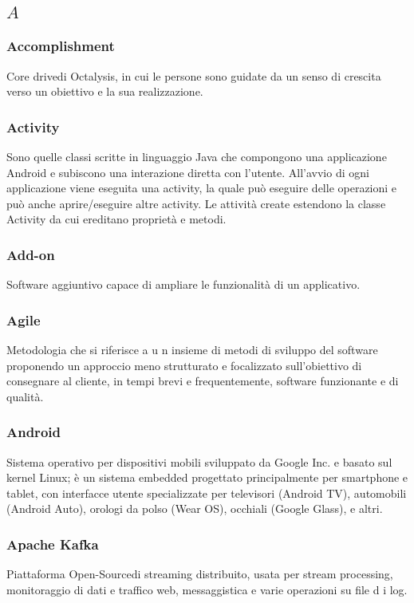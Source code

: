 \subsection*{\quad$A\quad$}
\subsubsection*{Accomplishment}
Core drive\glosp di Octalysis\glo, in cui le persone sono guidate da un senso di crescita verso un obiettivo e la sua realizzazione.

\subsubsection*{Activity}
Sono quelle classi scritte in linguaggio Java che compongono una applicazione Android e subiscono una interazione diretta con l'utente. All'avvio di ogni applicazione viene eseguita una activity, la quale può eseguire delle operazioni e può anche aprire/eseguire altre activity. Le attività create estendono la classe Activity da cui ereditano proprietà e metodi.

\subsubsection*{Add-on}
Software aggiuntivo capace di ampliare le funzionalità di un applicativo.

\subsubsection*{Agile}
Metodologia che si riferisce a u n insieme di metodi di sviluppo del software proponendo un approccio meno strutturato e focalizzato sull'obiettivo di consegnare al cliente, in tempi brevi e frequentemente, software funzionante e di qualità.

\subsubsection*{Android}
Sistema operativo per dispositivi mobili sviluppato da Google Inc. e basato sul kernel Linux; è un sistema embedded progettato principalmente per smartphone e tablet, con interfacce utente specializzate per televisori (Android TV), automobili (Android Auto), orologi da polso (Wear OS), occhiali (Google Glass), e altri.

\subsubsection*{Apache Kafka}
Piattaforma Open-Source\glosp di streaming distribuito, usata per stream processing, monitoraggio di dati e traffico web, messaggistica e varie operazioni su file d i log.

